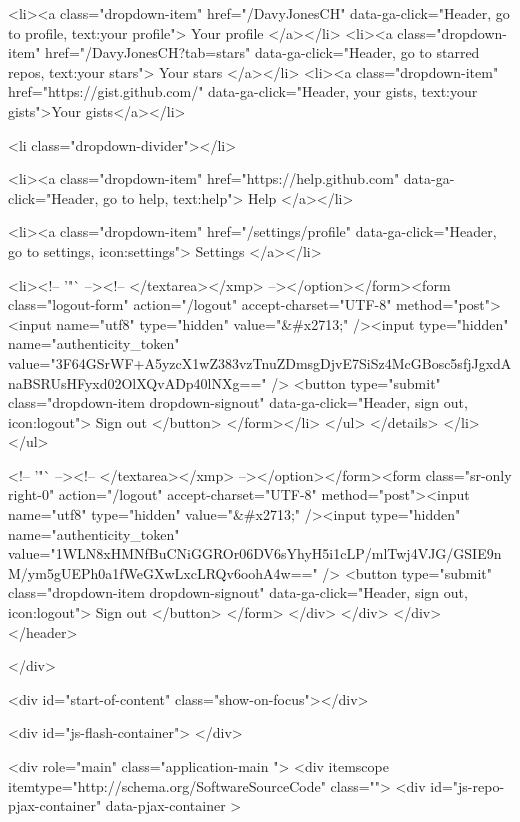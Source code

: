         <li><a class="dropdown-item" href="/DavyJonesCH" data-ga-click="Header, go to profile, text:your profile">
          Your profile
        </a></li>
        <li><a class="dropdown-item" href="/DavyJonesCH?tab=stars" data-ga-click="Header, go to starred repos, text:your stars">
          Your stars
        </a></li>
          <li><a class="dropdown-item" href="https://gist.github.com/" data-ga-click="Header, your gists, text:your gists">Your gists</a></li>

        <li class="dropdown-divider"></li>

        <li><a class="dropdown-item" href="https://help.github.com" data-ga-click="Header, go to help, text:help">
          Help
        </a></li>

        <li><a class="dropdown-item" href="/settings/profile" data-ga-click="Header, go to settings, icon:settings">
          Settings
        </a></li>

        <li><!-- '"` --><!-- </textarea></xmp> --></option></form><form class="logout-form" action="/logout" accept-charset="UTF-8" method="post"><input name="utf8" type="hidden" value="&#x2713;" /><input type="hidden" name="authenticity_token" value="3F64GSrWF+A5yzcX1wZ383vzTnuZDmsgDjvE7SiSz4McGBosc5sfjJgxdAnaBSRUsHFyxd02OlXQvADp40lNXg==" />
          <button type="submit" class="dropdown-item dropdown-signout" data-ga-click="Header, sign out, icon:logout">
            Sign out
          </button>
        </form></li>
      </ul>
    </details>
  </li>
</ul>



        <!-- '"` --><!-- </textarea></xmp> --></option></form><form class="sr-only right-0" action="/logout" accept-charset="UTF-8" method="post"><input name="utf8" type="hidden" value="&#x2713;" /><input type="hidden" name="authenticity_token" value="1WLN8xHMNfBuCNiGGROr06DV6sYhyH5i1cLP/mlTwj4VJG/GSIE9nM/ym5gUEPh0a1fWeGXwLxcLRQv6oohA4w==" />
          <button type="submit" class="dropdown-item dropdown-signout" data-ga-click="Header, sign out, icon:logout">
            Sign out
          </button>
</form>      </div>
    </div>
  </div>
</header>

      

  </div>

  <div id="start-of-content" class="show-on-focus"></div>

    <div id="js-flash-container">
</div>



  <div role="main" class="application-main ">
        <div itemscope itemtype="http://schema.org/SoftwareSourceCode" class="">
    <div id="js-repo-pjax-container" data-pjax-container >
      








